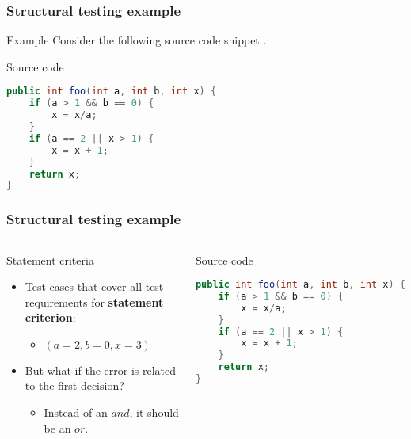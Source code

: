 \begin{frame}[hasprev=false, hasnext=true, fragile]
\frametitle{Structural testing example}
\label{example:structural-testing}

\begin{block}{Example}
Consider the following source code snippet \cite[p. 45]{myers:2004}.
\end{block}

\begin{block}{Source code}
\begin{lstlisting}[language=java]
public int foo(int a, int b, int x) {
	if (a > 1 && b == 0) {
		x = x/a;
	}
	if (a == 2 || x > 1) {
		x = x + 1;
	}
	return x;
}
\end{lstlisting}
\end{block}
\end{frame}


\begin{frame}[hasprev=true, hasnext=true, fragile]
\frametitle{Structural testing example}

\begin{columns}[t]
\begin{block}{Statement criteria}
\begin{itemize}
	\item Test cases that cover all test requirements for \textbf{statement
	criterion}:
	\begin{itemize}
		\item $(a = 2, b = 0, x = 3)$
	\end{itemize}

	\item But what if the error is related to the first decision?
	\begin{itemize}
		\item Instead of an $and$, it should be an $or$.
	\end{itemize}
\end{itemize}
\end{block}
\begin{block}{Source code}
\begin{lstlisting}[language=java]
public int foo(int a, int b, int x) {
	if (a > 1 && b == 0) {
		x = x/a;
	}
	if (a == 2 || x > 1) {
		x = x + 1;
	}
	return x;
}
\end{lstlisting}
\end{block}
\end{columns}
\end{frame}


